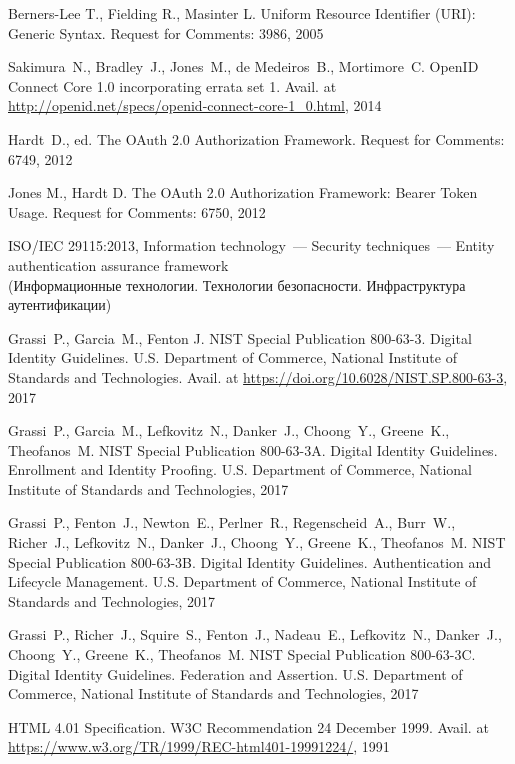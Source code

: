 \clearpage
\begin{thebibliography}{99}

Berners-Lee T., Fielding R., Masinter L. 
Uniform Resource Identifier (URI): Generic Syntax.
Request for Comments: 3986, 2005

Sakimura~N., Bradley~J., Jones~M., de Medeiros~B., Mortimore~C. 
OpenID Connect Core 1.0 incorporating errata set 1.
Avail. at \url{http://openid.net/specs/openid-connect-core-1_0.html}, 2014

Hardt~D., ed.
The OAuth 2.0 Authorization Framework.
Request for Comments: 6749, 2012

Jones M., Hardt D.
The OAuth 2.0 Authorization Framework: Bearer Token Usage.
Request for Comments: 6750, 2012

ISO/IEC 29115:2013, Information technology~---
Security techniques~--– Entity authentication assurance framework\\
{\small (Информационные технологии. Технологии безопасности. Инфраструктура 
аутентификации)}

Grassi~P., Garcia~M., Fenton J.
NIST Special Publication 800-63-3. Digital Identity Guidelines.
U.S. Department of Commerce, National Institute of Standards and Technologies. 
Avail. at \url{https://doi.org/10.6028/NIST.SP.800-63-3}, 2017

Grassi~P., Garcia~M., 
Lefkovitz~N., Danker~J., 
Choong~Y., Greene~K., Theofanos~M. 
NIST Special Publication 800-63-3A. Digital Identity Guidelines. Enrollment and 
Identity Proofing.
U.S. Department of Commerce, National Institute of Standards and Technologies, 
2017

Grassi~P., Fenton~J., Newton~E., Perlner~R., Regenscheid~A., Burr~W., Richer~J., 
Lefkovitz~N., Danker~J., 
Choong~Y., Greene~K., Theofanos~M. 
NIST Special Publication 800-63-3B. Digital Identity Guidelines. 
Authentication and Lifecycle Management.
U.S. Department of Commerce, National Institute of Standards and Technologies, 
2017

Grassi~P., Richer~J., Squire~S., Fenton~J., Nadeau~E., 
Lefkovitz~N., Danker~J., 
Choong~Y., Greene~K., Theofanos~M.
NIST Special Publication 800-63-3C. Digital Identity Guidelines. 
Federation and Assertion.
U.S. Department of Commerce, National Institute of Standards and Technologies, 
2017 

HTML 4.01 Specification. 
W3C Recommendation 24 December 1999.
Avail. at \url{https://www.w3.org/TR/1999/REC-html401-19991224/}, 1991


\end{thebibliography}
